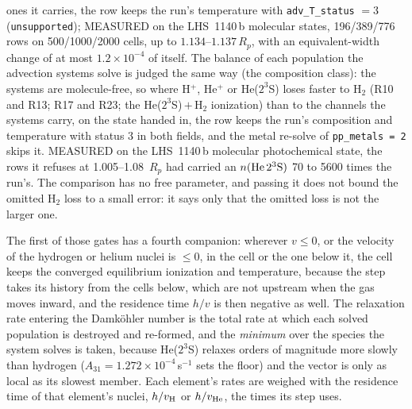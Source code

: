 \begin{itemize}
  ones it carries, the row keeps the run's temperature with
  \texttt{adv\_T\_status} $=3$ (\texttt{unsupported}); MEASURED on the
  LHS~1140\,b molecular states, 196/389/776 rows on 500/1000/2000 cells, up
  to $1.134$--$1.137\,R_p$, with an equivalent-width change of at most
  $1.2\times10^{-4}$ of itself.  The balance of each population the
  advection systems solve is judged the same way (the composition class):
  the systems are molecule-free, so where H$^+$, He$^+$ or He($2^3$S) loses
  faster to H$_2$ (R10 and R13; R17 and R23; the He($2^3$S)\,$+$\,H$_2$
  ionization) than to the channels the systems carry, on the state handed in,
  the row keeps the run's composition and temperature with status 3 in both
  fields, and the metal re-solve of \texttt{pp\_metals = 2} skips it.
  MEASURED on the LHS~1140\,b molecular photochemical state, the rows it
  refuses at 1.005--1.08~$R_p$ had carried an $n({\rm He}\,2^3{\rm S})$ 70 to
  5600 times the run's.  The comparison has no free parameter, and passing it
  does not bound the omitted H$_2$ loss to a small error: it says only that
  the omitted loss is not the larger one.
\end{itemize}

The first of those gates has a fourth companion: wherever $v\le0$, or the
velocity of the hydrogen or helium nuclei is $\le0$, in the cell
or the one below it, the cell keeps the converged equilibrium ionization and
temperature, because the step takes its history from the cells below, which
are not upstream when the gas moves inward, and the residence time $h/v$ is
then negative as well. The relaxation rate
entering the Damk\"ohler number is the total rate at which each solved
population is destroyed and re-formed, and the \emph{minimum} over the
species the system solves is taken, because He($2^3$S) relaxes orders of
magnitude more slowly than hydrogen ($A_{31} = 1.272\times10^{-4}$\,s$^{-1}$
sets the floor) and the vector is only as local as its slowest member. Each
element's rates are weighed with the residence time of that element's
nuclei, $h/v_{\rm H}$ or $h/v_{\rm He}$, the times its step uses.

